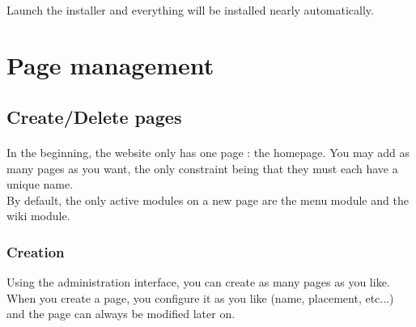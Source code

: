 \documentclass{article}
\begin{document}
    \paragraph{}
    Launch the installer and everything will be installed nearly automatically. 

\section{Page management}
\subsection{Create/Delete pages}
     \paragraph{}
     In the beginning, the website only has one page : the homepage. You may add as many pages as you want, the only constraint being that they must each have a unique name. \\
     By default, the only active modules on a new page are the menu module and the wiki module. 
\subsubsection{Creation}
Using the administration interface, you can create as many pages as you like. When you create a page, you configure it as you like (name, placement, etc...) and the page can always be modified later on. 
\end{document}
